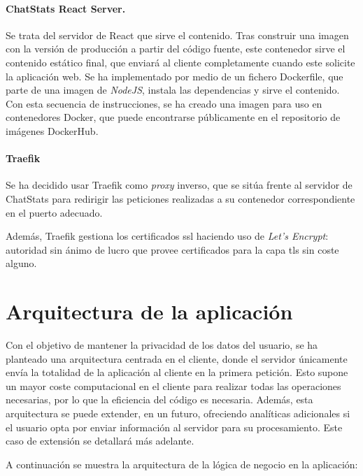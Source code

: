 \paragraph{ChatStats React Server.} Se trata del servidor de React que sirve el contenido. Tras construir una imagen con la versión de producción a partir del código fuente, este contenedor sirve el contenido estático final, que enviará al cliente completamente cuando este solicite la aplicación web. Se ha implementado por medio de un fichero Dockerfile, que parte de una imagen de \textit{NodeJS}, instala las dependencias y sirve el contenido. Con esta secuencia de instrucciones, se ha creado una imagen para uso en contenedores Docker, que puede encontrarse públicamente en el repositorio de imágenes DockerHub.

\paragraph{Traefik} Se ha decidido usar Traefik como \textit{proxy} inverso, que se sitúa frente al servidor de ChatStats para redirigir las peticiones realizadas a su contenedor correspondiente en el puerto adecuado.

Además, Traefik gestiona los certificados \acrshort{ssl} haciendo uso de \textit{Let's Encrypt}: autoridad sin ánimo de lucro que provee certificados para la capa \acrshort{tls} sin coste alguno.








\section{Arquitectura de la aplicación}
\label{chap:architecture:processing}


Con el objetivo de mantener la privacidad de los datos del usuario, se ha planteado una arquitectura centrada en el cliente, donde el servidor únicamente envía la totalidad de la aplicación al cliente en la primera petición. Esto supone un mayor coste computacional en el cliente para realizar todas las operaciones necesarias, por lo que la eficiencia del código es necesaria. Además, esta arquitectura se puede extender, en un futuro, ofreciendo analíticas adicionales si el usuario opta por enviar información al servidor para su procesamiento. Este caso de extensión se detallará más adelante.

A continuación se muestra la arquitectura de la lógica de negocio en la aplicación:

